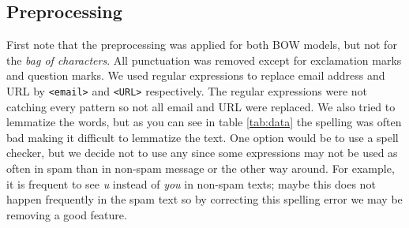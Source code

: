 \documentclass[10pt]{article}
\begin{document}
\subsection{Preprocessing}
First note that the preprocessing was applied for both BOW models, but not for the \textit{bag of characters}. All punctuation was removed except for exclamation marks and question marks. We used regular expressions to replace email address and URL by \texttt{<email>} and \texttt{<URL>} respectively. The regular expressions were not catching every pattern so not all email and URL were replaced. We also tried to lemmatize the words, but as you can see in table \ref{tab:data} the spelling was often bad making it difficult to lemmatize the text. One option would be to use a spell checker, but we decide not to use any since some expressions may not be used as often in spam than in non-spam message or the other way around. For example, it is frequent to see \textit{u} instead of \textit{you} in non-spam texts; maybe this does not happen frequently in the spam text so by correcting this spelling error we may be removing a good feature.
\end{document}
